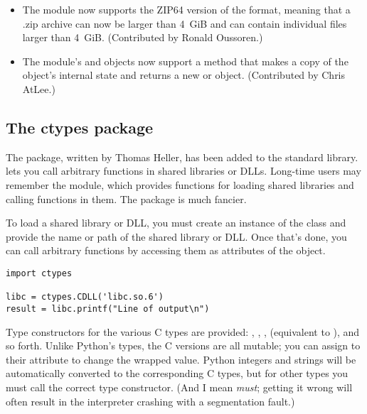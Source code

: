 \documentclass{howto}
\begin{document}
\begin{itemize}
\item The  module now supports the ZIP64 version of the 
format, meaning that a .zip archive can now be larger than 4~GiB and
can contain individual files larger than 4~GiB.  (Contributed by
Ronald Oussoren.)

\item The  module's  and 
objects now support a  method that makes a copy of the 
object's internal state and returns a new 
 or  object. 
(Contributed by Chris AtLee.)

\end{itemize}



\subsection{The ctypes package\label{module-ctypes}}

The  package, written by Thomas Heller, has been added 
to the standard library.   lets you call arbitrary functions 
in shared libraries or DLLs.  Long-time users may remember the  module, which 
provides functions for loading shared libraries and calling functions in them.  The  package is much fancier.

To load a shared library or DLL, you must create an instance of the 
 class and provide the name or path of the shared library
or DLL.  Once that's done, you can call arbitrary functions
by accessing them as attributes of the  object.  

\begin{verbatim}
import ctypes

libc = ctypes.CDLL('libc.so.6')
result = libc.printf("Line of output\n")
\end{verbatim}

Type constructors for the various C types are provided: ,
, ,  (equivalent to ), and so forth.  Unlike Python's types, the C versions are all mutable; you can assign to their  attribute
to change the wrapped value.  Python integers and strings will be automatically
converted to the corresponding C types, but for other types you 
must call the correct type constructor.  (And I mean \emph{must}; 
getting it wrong will often result in the interpreter crashing 
with a segmentation fault.)
\end{document}

